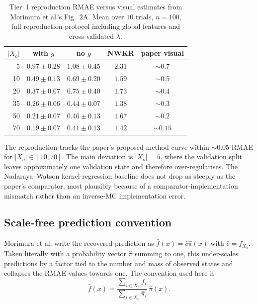 \begin{table}[H]
\centering
\caption{Tier~1 reproduction RMAE versus visual estimates from Morimura
et al.'s Fig.~2A. Mean over $10$ trials, $n=100$, full reproduction protocol
including global features and cross-validated $\lambda$.}
\label{tab:phase1-rmae}
\scriptsize
\begin{tabular}{rcccc}
\toprule
$|X_o|$ & with $g$ & no $g$ & NWKR & paper visual \\
\midrule
5  & $0.97 \pm 0.28$ & $1.08 \pm 0.45$ & $2.31$ & $\sim 0.7$ \\
10 & $0.49 \pm 0.13$ & $0.69 \pm 0.20$ & $1.59$ & $\sim 0.5$ \\
20 & $0.37 \pm 0.07$ & $0.75 \pm 0.40$ & $1.73$ & $\sim 0.4$ \\
35 & $0.26 \pm 0.06$ & $0.44 \pm 0.07$ & $1.38$ & $\sim 0.3$ \\
50 & $0.21 \pm 0.07$ & $0.46 \pm 0.13$ & $1.67$ & $\sim 0.2$ \\
70 & $0.19 \pm 0.07$ & $0.41 \pm 0.13$ & $1.42$ & $\sim 0.15$ \\
\bottomrule
\end{tabular}
\end{table}

The reproduction tracks the paper's proposed-method curve within
$\sim 0.05$ RMAE for $|X_o|\in[10,70]$. The main deviation is $|X_o|=5$,
where the validation split leaves approximately one validation state and
therefore over-regularises. The Nadaraya--Watson kernel-regression
baseline does not drop as steeply as the paper's comparator, most plausibly
because of a comparator-implementation mismatch rather than an inverse-MC
implementation error.

\subsection*{Scale-free prediction convention}

Morimura et al. write the recovered prediction as
$\hat{f}(x)=\hat{c}\hat{\pi}(x)$ with
$\hat{c}=\overline{f}_{X_o}$. Taken literally with a probability vector
$\hat{\pi}$ summing to one, this under-scales predictions by a factor tied
to the number and mass of observed states and collapses the RMAE values
towards one. The convention used here is
\begin{equation}
\hat{f}(x)=
\frac{\sum_{i\in X_o} f_i}{\sum_{i\in X_o}\hat{\pi}_i}\,
\hat{\pi}(x).
\label{eq:scale-free-prediction}
\end{equation}

